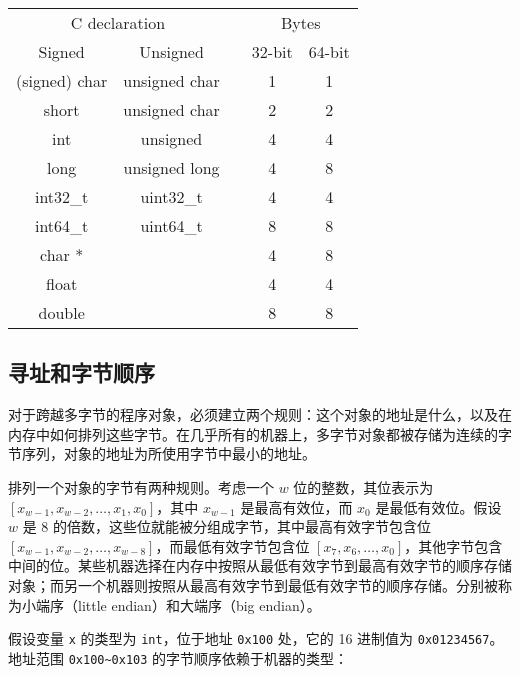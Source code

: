 \begin{table}[!ht]
    \centering
    \begin{tabular}{ccccc}
        \toprule
        \multicolumn{2}{c}{C declaration} & & \multicolumn{2}{c}{Bytes} \\
        \cmidrule{1-2}
        \cmidrule{4-5}
        Signed & Unsigned & & 32-bit & 64-bit \\
        \midrule
        (signed) char  & unsigned char  & & 1 & 1 \\
        short          & unsigned char  & & 2 & 2 \\
        int            & unsigned       & & 4 & 4 \\
        long           & unsigned long  & & 4 & 8 \\
        int32\_t       & uint32\_t      & & 4 & 4 \\
        int64\_t       & uint64\_t      & & 8 & 8 \\
        char *         &                & & 4 & 8 \\
        float          &                & & 4 & 4 \\
        double         &                & & 8 & 8 \\
        \bottomrule
    \end{tabular}
\end{table}

\subsection{寻址和字节顺序}

对于跨越多字节的程序对象，必须建立两个规则：这个对象的地址是什么，以及在内存中如何排列这些字节。在几乎所有的机器上，多字节对象都被存储为连续的字节序列，对象的地址为所使用字节中最小的地址。

排列一个对象的字节有两种规则。考虑一个 $w$ 位的整数，其位表示为 $[x_{w-1}, x_{w-2}, \dots, x_1, x_0]$，其中 $x_{w-1}$ 是最高有效位，而 $x_0$ 是最低有效位。假设 $w$ 是 8 的倍数，这些位就能被分组成字节，其中最高有效字节包含位 $[x_{w-1}, x_{w-2}, \dots, x_{w-8}]$，而最低有效字节包含位 $[x_7, x_6, \dots, x_0]$，其他字节包含中间的位。某些机器选择在内存中按照从最低有效字节到最高有效字节的顺序存储对象；而另一个机器则按照从最高有效字节到最低有效字节的顺序存储。分别被称为小端序（little endian）和大端序（big endian）。

假设变量 \verb|x| 的类型为 \verb|int|，位于地址 \verb|0x100| 处，它的 16 进制值为 \verb|0x01234567|。地址范围 \verb|0x100~0x103| 的字节顺序依赖于机器的类型：

